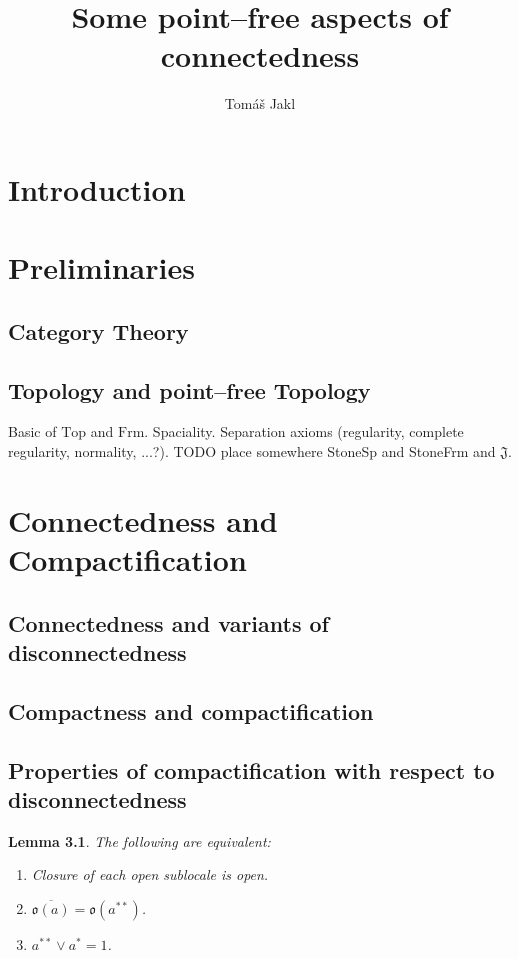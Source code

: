 \documentclass[12pt,a4paper,fleqn]{report}
\title{Some point--free aspects of connectedness}
\author{Tom\'a\v s Jakl}
\newcounter{thmCounter}[section]
\theoremstyle{newthmstyle}
\newtheorem{lemma}[thmCounter]{Lemma}
\theoremstyle{newthmstyleNormal}
\newcommand\Frm{\ensuremath{\mathrm{Frm}}}
\newcommand\Top{\ensuremath{\mathrm{Top}}}
\newcommand\J{\ensuremath{\mathfrak{J}}}
\newcommand\closure[1]{\overline{#1}}
\begin{document}
\maketitle
\tableofcontents

\chapter{Introduction}

\chapter{Preliminaries}
\section{Category Theory}
\section{Topology and point--free Topology}
Basic of \Top{} and \Frm.
Spaciality.
Separation axioms (regularity, complete regularity, normality, ...?).
TODO place somewhere StoneSp and StoneFrm and \J.

\chapter{Connectedness and Compactification}
\section{Connectedness and variants of disconnectedness}
\section{Compactness and compactification}
\section{Properties of compactification with respect to disconnectedness}
\begin{lemma}
    The following are equivalent:

    \begin{enumerate}
        \item Closure of each open sublocale is open.
        \item $\closure{\mathfrak{o}(a)} = \mathfrak{o}(a^{**})$.
        \item $a^{**} \vee a^* = 1$.
    \end{enumerate}
\end{lemma}
\end{document}
